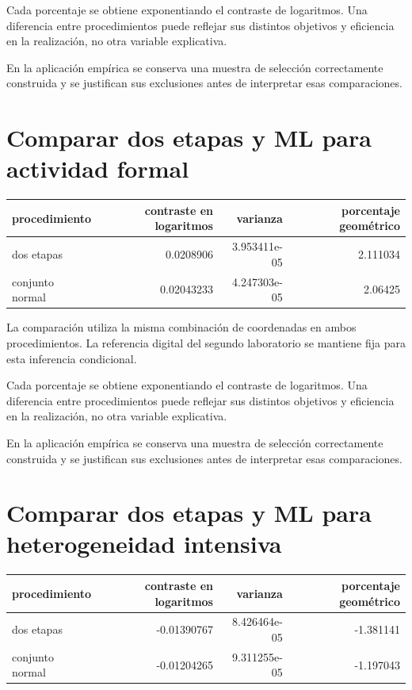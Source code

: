 \documentclass[11pt,a4paper]{article}
\begin{document}
Cada porcentaje se obtiene exponentiando el contraste de logaritmos. Una diferencia entre procedimientos puede reflejar sus distintos objetivos y eficiencia en la realización, no otra variable explicativa.

En la aplicación empírica se conserva una muestra de selección correctamente construida y se justifican sus exclusiones antes de interpretar esas comparaciones.

\clearpage
\section{Comparar dos etapas y ML para actividad formal}

\begin{center}\small
\begin{tabular}{lrrr}
\toprule
procedimiento & contraste en logaritmos & varianza & porcentaje geométrico\\\midrule
dos etapas & 0.0208906 & 3.953411e-05 & 2.111034\\
conjunto normal & 0.02043233 & 4.247303e-05 & 2.06425\\
\bottomrule
\end{tabular}\end{center}

La comparación utiliza la misma combinación de coordenadas en ambos procedimientos. La referencia digital del segundo laboratorio se mantiene fija para esta inferencia condicional.

Cada porcentaje se obtiene exponentiando el contraste de logaritmos. Una diferencia entre procedimientos puede reflejar sus distintos objetivos y eficiencia en la realización, no otra variable explicativa.

En la aplicación empírica se conserva una muestra de selección correctamente construida y se justifican sus exclusiones antes de interpretar esas comparaciones.

\clearpage
\section{Comparar dos etapas y ML para heterogeneidad intensiva}

\begin{center}\small
\begin{tabular}{lrrr}
\toprule
procedimiento & contraste en logaritmos & varianza & porcentaje geométrico\\\midrule
dos etapas & -0.01390767 & 8.426464e-05 & -1.381141\\
conjunto normal & -0.01204265 & 9.311255e-05 & -1.197043\\
\bottomrule
\end{tabular}\end{center}
\end{document}
